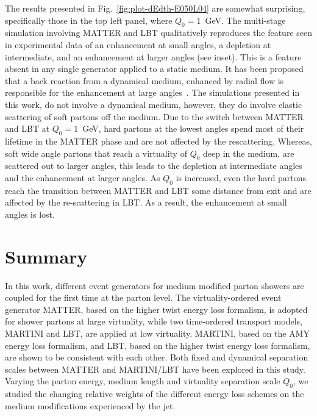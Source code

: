 \documentclass[aps,prc,twocolumn,floatfix,superscriptaddress,nofootinbib]{revtex4}
\begin{document}
The results presented in Fig.~\ref{fig:plot-dEdth-E050L04} are somewhat surprising, specifically those in the top left panel, where $Q_0 = 1$~GeV. The multi-stage simulation involving MATTER and LBT qualitatively reproduces the feature seen in experimental data of an enhancement at small angles, a depletion at intermediate, and an enhancement at larger angles (see inset). 
This is a feature absent in any single generator applied to a static medium. It has been proposed that a back reaction from a dynamical medium, enhanced by radial flow is responsible for the enhancement at large angles~\cite{Casalderrey-Solana:2016jvj}. The simulations presented in this work, do not involve a dynamical medium, however, they do involve elastic scattering of soft partons off the medium. Due to the switch between MATTER and LBT at $Q_0 = 1$~GeV, hard partons at the lowest angles spend most of their lifetime in the MATTER phase and are not affected by the rescattering. Whereas, soft wide angle partons that reach a virtuality of $Q_0$ deep in the medium, are scattered out to larger angles, this leads to the depletion at intermediate angles and the enhancement at larger angles. As $Q_0$ is increased, even the hard partons reach the transition between MATTER and LBT some distance from exit and are affected by the re-scattering in LBT. As a result, the enhancement at small angles is lost.


\section{Summary}
\label{sec:summary}

In this work, different event generators for medium modified parton showers are coupled for the first time at the parton level. The virtuality-ordered event generator MATTER, based on the higher twist energy loss formalism, is adopted for shower partons at large virtuality, while two time-ordered transport models, MARTINI and LBT, are applied at low virtuality. MARTINI, based on the AMY energy loss formalism, and LBT, based on the higher twist energy loss formalism, are shown to be consistent with each other. Both fixed and dynamical separation scales between MATTER and MARTINI/LBT have been explored in this study. Varying the parton energy, medium length and virtuality separation scale $Q_0$, we studied the changing relative weights of the different energy loss schemes on the medium modifications experienced by the jet.  
\end{document}
